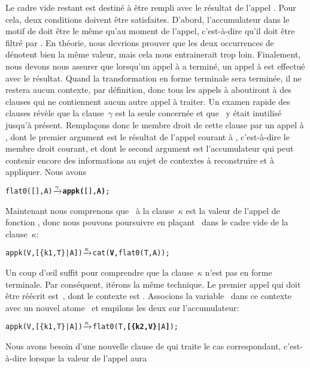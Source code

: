 Le cadre vide restant est destiné à être rempli avec le résultat de
l'appel . Pour cela, deux conditions
doivent être satisfaites. D'abord, l'accumulateur dans le motif de
 doit être le même qu'au moment de l'appel,
c'est-à-dire qu'il doit être filtré par \erlcode{[\{k1,T\}|A]}. En
théorie, nous devrions prouver que les deux occurrences de~
dénotent bien la même valeur, mais cela nous entrainerait trop
loin. Finalement, nous devons nous assurer que lorsqu'un appel à
 a terminé, un appel à  est effectué
avec le résultat. Quand la transformation en forme terminale sera
terminée, il ne restera aucun contexte, par définition, donc tous les
appels à  aboutiront à des clauses qui ne contiennent
aucun autre appel à traiter. Un examen rapide des clauses révèle que
la clause~\(\gamma\) est la seule concernée et que ~y était
inutilisé jusqu'à présent. Remplaçons donc le membre droit de cette
clause par un appel à , dont le premier argument est
le résultat de l'appel courant à , c'est-à-dire le
membre droit courant, et dont le second argument est l'accumulateur
qui peut contenir encore des informations au sujet de contextes à
reconstruire et à appliquer. Nous avons
\begin{alltt}
flat0(       [],A) \(\smashedrightarrow{\gamma}\) \textbf{appk(}[],\textbf{A)};
\end{alltt}
Maintenant nous comprenons que~ à la clause~\(\kappa\) est
la valeur de l'appel de fonction , donc
nous pouvons poursuivre en plaçant~ dans le cadre vide de la clause~\(\kappa\):
\begin{alltt}
appk(V,[\{k1,T\}|A]) \(\smashedrightarrow{\kappa}\) cat(\textbf{V},flat0(T,A));
\end{alltt}
Un coup d'œil suffit pour comprendre que la clause~\(\kappa\)
n'est pas en forme terminale. Par conséquent, itérons la même
technique. Le premier appel qui doit être réécrit
est~, dont le contexte est
. Associons la variable~
dans ce contexte avec un nouvel atome~ et empilons les
deux sur l'accumulateur:
\begin{alltt}
appk(V,[\{k1,T\}|A]) \(\smashedrightarrow{\kappa}\) flat0(T,\textbf{[\{k2,V\}|}A\textbf{]});
\end{alltt}
Nous avons besoin d'une nouvelle clause de  qui traite
le cas correspondant, c'est-à-dire lorsque la valeur de l'appel aura

